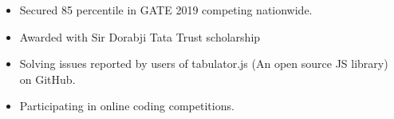 \smallskip
\begin{itemize}
\item Secured 85 percentile in GATE 2019 competing nationwide.
\smallskip
\item Awarded with Sir Dorabji Tata Trust scholarship
\smallskip
\end{itemize}

\smallskip
\begin{itemize}
\item Solving issues reported by users of tabulator.js (An open source JS library) on GitHub.
\smallskip
\item Participating in online coding competitions.
\smallskip
\end{itemize}

\cvproject{}